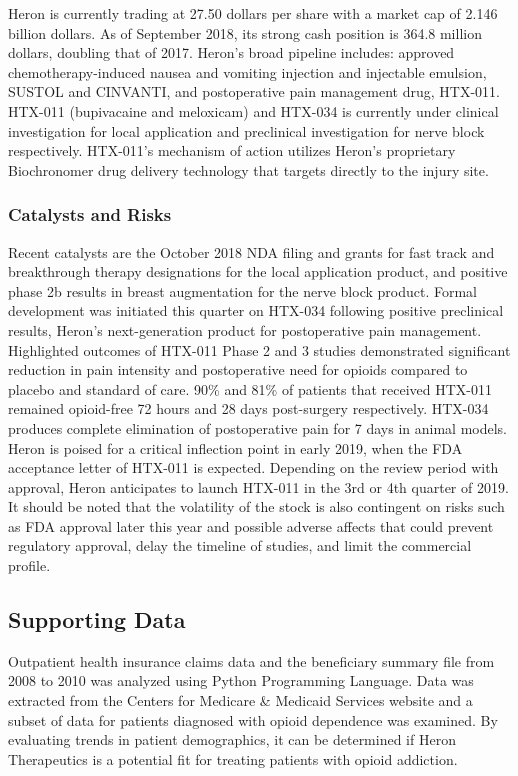 \documentclass[11pt]{article}
\begin{document}
Heron is currently trading at 27.50 dollars per share with a market cap
of 2.146 billion dollars. As of September 2018, its strong cash position
is 364.8 million dollars, doubling that of 2017. Heron's broad pipeline
includes: approved chemotherapy-induced nausea and vomiting injection
and injectable emulsion, SUSTOL and CINVANTI, and postoperative pain
management drug, HTX-011. HTX-011 (bupivacaine and meloxicam) and
HTX-034 is currently under clinical investigation for local application
and preclinical investigation for nerve block respectively. HTX-011's
mechanism of action utilizes Heron's proprietary Biochronomer drug
delivery technology that targets directly to the injury site.

\subsubsection{Catalysts and Risks}\label{catalysts-and-risks}

Recent catalysts are the October 2018 NDA filing and grants for fast
track and breakthrough therapy designations for the local application
product, and positive phase 2b results in breast augmentation for the
nerve block product. Formal development was initiated this quarter on
HTX-034 following positive preclinical results, Heron's next-generation
product for postoperative pain management. Highlighted outcomes of
HTX-011 Phase 2 and 3 studies demonstrated significant reduction in pain
intensity and postoperative need for opioids compared to placebo and
standard of care. 90\% and 81\% of patients that received HTX-011
remained opioid-free 72 hours and 28 days post-surgery respectively.
HTX-034 produces complete elimination of postoperative pain for 7 days
in animal models. Heron is poised for a critical inflection point in
early 2019, when the FDA acceptance letter of HTX-011 is expected.
Depending on the review period with approval, Heron anticipates to
launch HTX-011 in the 3rd or 4th quarter of 2019. It should be noted
that the volatility of the stock is also contingent on risks such as FDA
approval later this year and possible adverse affects that could prevent
regulatory approval, delay the timeline of studies, and limit the
commercial profile.

    \subsection{Supporting Data}\label{supporting-data}

Outpatient health insurance claims data and the beneficiary summary file
from 2008 to 2010 was analyzed using Python Programming Language. Data
was extracted from the Centers for Medicare \& Medicaid Services website
and a subset of data for patients diagnosed with opioid dependence was
examined. By evaluating trends in patient demographics, it can be
determined if Heron Therapeutics is a potential fit for treating
patients with opioid addiction.
\end{document}
